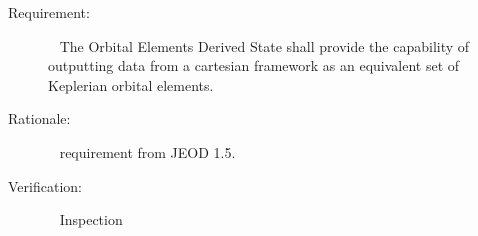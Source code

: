 
%
%
% 
%

\label{reqt:OrbElem}
\begin{description}
  \item[Requirement:]\ \newline
    The Orbital Elements Derived State shall provide the capability of outputting data from a cartesian framework as an equivalent set of Keplerian orbital elements.
  \item[Rationale:]\ \newline
     requirement from JEOD 1.5.
  \item[Verification:]\ \newline
     Inspection
\end{description}


